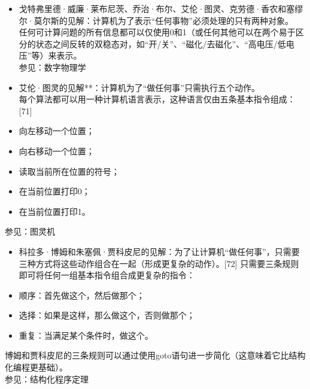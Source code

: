 \begin{itemize}
\item 戈特弗里德·威廉·莱布尼茨、乔治·布尔、艾伦·图灵、克劳德·香农和塞缪尔·莫尔斯的见解：计算机为了表示“任何事物”必须处理的只有两种对象。\\  
   任何可计算问题的所有信息都可以仅使用0和1（或任何其他可以在两个易于区分的状态之间反转的双稳态对，如“开/关”、“磁化/去磁化”、“高电压/低电压”等）来表示。\\  
   参见：数字物理学  
\item 艾伦·图灵的见解**：计算机为了“做任何事”只需执行五个动作。\\  
   每个算法都可以用一种计算机语言表示，这种语言仅由五条基本指令组成：[71]  
\item 向左移动一个位置；  
\item 向右移动一个位置；  
\item 读取当前所在位置的符号；  
\item 在当前位置打印0；  
\item 在当前位置打印1。 
\end{itemize} 
   参见：图灵机 
\begin{itemize}
\item 科拉多·博姆和朱塞佩·贾科皮尼的见解：为了让计算机“做任何事”，只需要三种方式将这些动作组合在一起（形成更复杂的动作）。[72] 
   只需要三条规则即可将任何一组基本指令组合成更复杂的指令：  
\item 顺序：首先做这个，然后做那个；  
\item 选择：如果是这样，那么做这个，否则做那个；  
\item 重复：当满足某个条件时，做这个。
\end{itemize}  
   博姆和贾科皮尼的三条规则可以通过使用goto语句进一步简化（这意味着它比结构化编程更基础）。\\ 
   参见：结构化程序定理
